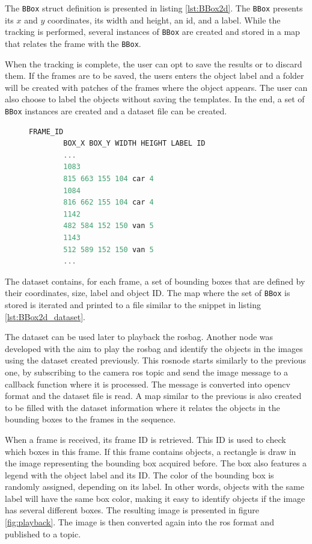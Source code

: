 The \texttt{BBox} struct definition is presented in listing \ref{lst:BBox2d}. The \texttt{BBox} presents its $x$ and $y$ coordinates, its width and height, an id, and a label. While the tracking is performed, several instances of \texttt{BBox} are created and stored in a map that relates the frame with the \texttt{BBox}. 

When the tracking is complete, the user can opt to save the results or to discard them. If the frames are to be saved, the users enters the object label and a folder will be created with patches of the frames where the object appears. The user can also choose to label the objects without saving the templates. In the end, a set of \texttt{BBox} instances are created and a dataset file can be created.

\begin{figure}
	\begin{center}
		\begin{lstlisting}[label={lst:BBox2d_dataset}, caption={2D dataset example snippet},language=c++]
		FRAME_ID 
		BOX_X BOX_Y WIDTH HEIGHT LABEL ID
		...
		1083
		815 663 155 104 car 4
		1084
		816 662 155 104 car 4
		1142
		482 584 152 150 van 5
		1143
		512 589 152 150 van 5
		...\end{lstlisting}
	\end{center}
\end{figure}

The dataset contains, for each frame, a set of bounding boxes that are defined by their coordinates, size, label and object ID. The map where the set of \texttt{BBox} is stored is iterated and printed to a file similar to the snippet in listing \ref{lst:BBox2d_dataset}.

The dataset can be used later to playback the rosbag. Another node was developed with the aim to play the rosbag and identify the objects in the images using the dataset created previously. This rosnode starts similarly to the previous one, by subscribing to the camera \gls{ros} topic and send the image message to a callback function where it is processed. The message is converted into \gls{opencv} format and the dataset file is read. A map similar to the previous is also created to be filled with the dataset information where it relates the objects in the bounding boxes to the frames in the sequence. 

When a frame is received, its frame ID is retrieved. This ID is used to check which boxes in this frame. If this frame contains objects, a rectangle is draw in the image representing the bounding box acquired before. The box also features a legend with the object label and its ID. The color of the bounding box is randomly assigned, depending on its label. In other words, objects with the same label will have the same box color, making it easy to identify objects if the image has several different boxes. The resulting image is presented in figure \ref{fig:playback}. The image is then converted again into the \gls{ros} format and published to a topic.

